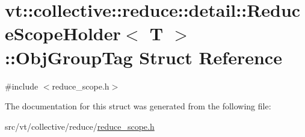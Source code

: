 \hypertarget{structvt_1_1collective_1_1reduce_1_1detail_1_1_reduce_scope_holder_1_1_obj_group_tag}{}\section{vt\+:\+:collective\+:\+:reduce\+:\+:detail\+:\+:Reduce\+Scope\+Holder$<$ T $>$\+:\+:Obj\+Group\+Tag Struct Reference}
\label{structvt_1_1collective_1_1reduce_1_1detail_1_1_reduce_scope_holder_1_1_obj_group_tag}


{\ttfamily \#include $<$reduce\+\_\+scope.\+h$>$}



The documentation for this struct was generated from the following file\+:\begin{DoxyCompactItemize}
\item 
src/vt/collective/reduce/\hyperlink{reduce__scope_8h}{reduce\+\_\+scope.\+h}\end{DoxyCompactItemize}

